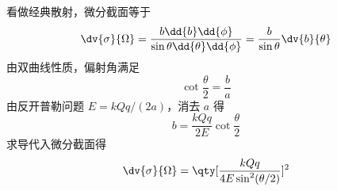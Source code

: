 
看做经典散射，微分截面等于
\begin{equation}
\dv{\sigma}{\Omega} = \frac{b \dd{b}\dd{\phi} }{\sin \theta \dd{\theta} \dd{\phi} } = \frac{b}{\sin \theta }\dv{b}{\theta}
\end{equation}
由双曲线性质，偏射角满足
\begin{equation}
\cot{\frac{\theta }{2}}= \frac{b}{a}
\end{equation}
由反开普勒问题  $E = kQq/(2a)$，消去 $a$ 得
\begin{equation}
b = \frac{kQq}{2E}\cot {\frac{\theta }{2}}
\end{equation}
求导代入微分截面得
\begin{equation}
\dv{\sigma}{\Omega} = \qty[ \frac{kQq}{4E \sin^2(\theta /2)} ]^2
\end{equation}
